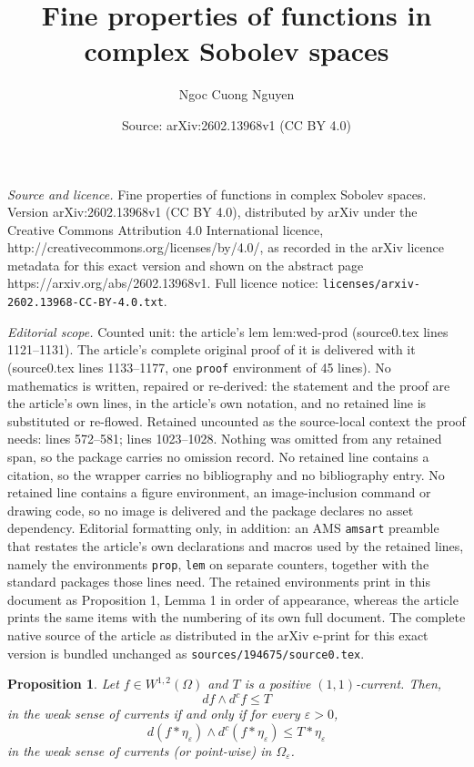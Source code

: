 \documentclass[10pt,a4paper]{amsart}
\title{Fine properties of functions in complex Sobolev spaces}
\author{Ngoc Cuong Nguyen}
\date{Source: arXiv:2602.13968v1 (CC BY 4.0)}
\newtheorem{prop}{Proposition}
\newcommand{\Om}{\Omega}
\newcommand{\veps}{\varepsilon}
\newcommand{\wed}{\wedge}
\begin{document}
\maketitle

\noindent\emph{Source and licence.} Fine properties of functions in complex Sobolev spaces. Version arXiv:2602.13968v1 (CC BY 4.0), distributed by arXiv under the Creative Commons Attribution 4.0 International licence, http://creativecommons.org/licenses/by/4.0/, as recorded in the arXiv licence metadata for this exact version and shown on the abstract page https://arxiv.org/abs/2602.13968v1. Full licence notice: \texttt{licenses/arxiv-2602.13968-CC-BY-4.0.txt}.\par\smallskip

\noindent\textit{Editorial scope.} Counted unit: the article's lem lem:wed-prod (source0.tex lines 1121--1131). The article's complete original proof of it is delivered with it (source0.tex lines 1133--1177, one \texttt{proof} environment of 45 lines). No mathematics is written, repaired or re-derived: the statement and the proof are the article's own lines, in the article's own notation, and no retained line is substituted or re-flowed.  Retained uncounted as the source-local context the proof needs: lines 572--581; lines 1023--1028.  Nothing was omitted from any retained span, so the package carries no omission record.  No retained line contains a citation, so the wrapper carries no bibliography and no bibliography entry.  No retained line contains a figure environment, an image-inclusion command or drawing code, so no image is delivered and the package declares no asset dependency.  Editorial formatting only, in addition: an AMS \texttt{amsart} preamble that restates the article's own declarations and macros used by the retained lines, namely the environments \texttt{prop}, \texttt{lem} on separate counters, together with the standard packages those lines need.  The retained environments print in this document as Proposition 1, Lemma 1 in order of appearance, whereas the article prints the same items with the numbering of its own full document.  The complete native source of the article as distributed in the arXiv e-print for this exact version is bundled unchanged as \texttt{sources/194675/source0.tex}.
\begin{prop}\label{prop:ineq-weak}  Let $f \in W^{1,2}(\Om)$ and $T$ is a positive $(1,1)$-current. Then,
$$
	df \wed d^c f \leq T
$$
in the weak sense of currents if and only if for every $ \veps>0$,
$$
	d (f*\eta_\veps) \wed d^c (f *\eta_\veps) \leq T*\eta_\veps 
$$
in the weak sense of currents (or point-wise) in $\Om_\veps$.
\end{prop}
\end{document}
